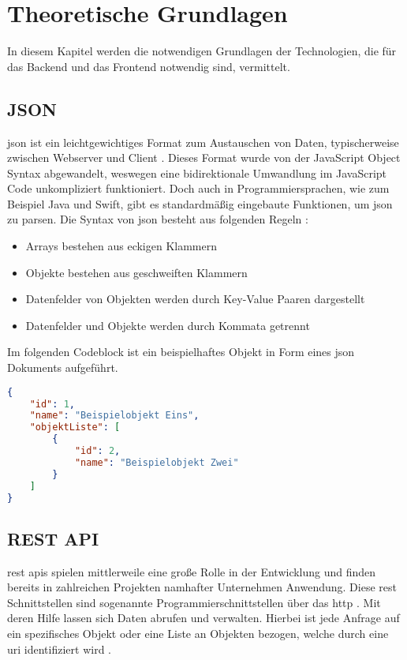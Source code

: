 \chapter{Theoretische Grundlagen}
In diesem Kapitel werden die notwendigen Grundlagen der Technologien, die für das Backend und das Frontend notwendig sind, vermittelt.

\section{JSON}
\gls{json} ist ein leichtgewichtiges Format zum Austauschen von Daten, typischerweise zwischen Webserver und Client \cite[S.~23]{client-server-book}.
Dieses Format wurde von der JavaScript Object Syntax abgewandelt, weswegen eine bidirektionale Umwandlung im JavaScript Code unkompliziert funktioniert.
Doch auch in Programmiersprachen, wie zum Beispiel Java und Swift, gibt es standardmäßig eingebaute Funktionen, um \gls{json} zu parsen.
Die Syntax von \gls{json} besteht aus folgenden Regeln \cite[S.~23]{client-server-book}:

\begin{itemize}
	\item Arrays bestehen aus eckigen Klammern
	\item Objekte bestehen aus geschweiften Klammern
	\item Datenfelder von Objekten werden durch Key-Value Paaren dargestellt
	\item Datenfelder und Objekte werden durch Kommata getrennt
\end{itemize}

Im folgenden Codeblock ist ein beispielhaftes Objekt in Form eines \gls{json} Dokuments aufgeführt.
\begin{lstlisting}[language=Json]
{
	"id": 1,
	"name": "Beispielobjekt Eins",
	"objektListe": [
		{
			"id": 2,
			"name": "Beispielobjekt Zwei"
		}
	]
}
\end{lstlisting}

\clearpage

\section{REST API} \label{rest}
\gls{rest} \glspl{api} spielen mittlerweile eine große Rolle in der Entwicklung und finden bereits in zahlreichen Projekten namhafter Unternehmen Anwendung. Diese \gls{rest} Schnittstellen sind sogenannte Programmierschnittstellen über das \gls{http} \cite[S.~259]{client-server-book}. Mit deren Hilfe lassen sich Daten abrufen und verwalten.
Hierbei ist jede Anfrage auf ein spezifisches Objekt oder eine Liste an Objekten bezogen, welche durch eine \gls{uri} identifiziert wird \cite[S.~259]{client-server-book}.

